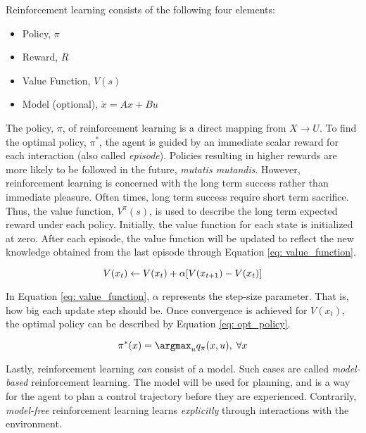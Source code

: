 Reinforcement learning consists of the following four elements:

\begin{itemize}
    \item Policy, $\pi$
    \item Reward, $R$
    \item Value Function, $V(s)$
    \item Model (optional), $\dot{x} = Ax + Bu$
\end{itemize}

The policy, $\pi$, of reinforcement learning is a direct mapping from $X \rightarrow U$.  To find the optimal policy, $\pi^*$, the agent is guided by an immediate scalar reward for each interaction (also called \textit{episode}). Policies resulting in higher rewards are more likely to be followed in the future, \textit{mutatis mutandis}.  However, reinforcement learning is concerned with the long term success rather than immediate pleasure. Often times, long term success require short term sacrifice.  Thus, the value function, $V^{\pi}(s)$, is used to describe the long term expected reward under each policy.  Initially, the value function for each state is initialized at zero.  After each episode, the value function will be updated to reflect the new knowledge obtained from the last episode through Equation \ref{eq: value_function}.

\begin{equation}
    \centering
    V(x_t) \leftarrow V(x_t) + \alpha [V(x_{t + 1}) - V(x_t)]
    \label{eq: value_function}
\end{equation}

In Equation \ref{eq: value_function}, $\alpha$ represents the step-size parameter.  That is, how big each update step should be.  Once convergence is achieved for $V(x_t)$, the optimal policy can be described by Equation \ref{eq: opt_policy}.  

\begin{equation}
    \centering
    \pi^*(x) = \argmax_u q_{\pi}(x, u), \; \forall x 
    \label{eq: opt_policy}
\end{equation}

Lastly, reinforcement learning \textit{can} consist of a model. Such cases are called \textit{model-based} reinforcement learning.  The model will be used for planning, and is a way for the agent to plan a control trajectory before they are experienced.  Contrarily, \textit{model-free} reinforcement learning learns \textit{explicitly} through interactions with the environment.

